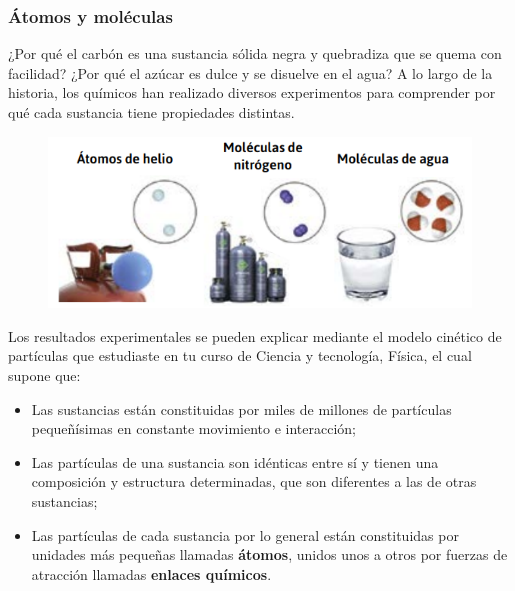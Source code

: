 \documentclass[11pt]{book}
\begin{document}
\subsubsection{Átomos y moléculas}

¿Por qué el carbón es una sustancia sólida negra y quebradiza que se quema con facilidad?
¿Por qué el azúcar es dulce y se disuelve en el agua? A lo largo de la historia, los químicos han realizado
diversos experimentos para comprender por qué cada sustancia tiene propiedades distintas.
\begin{figure}
  \centering
  \includegraphics[width=\linewidth]{atomos01.png}
  \label{fig:atomos01}
\end{figure}
Los resultados experimentales se pueden explicar mediante el modelo
cinético de partículas que estudiaste en tu curso de Ciencia y tecnología, Física, el cual supone que:


\begin{itemize}
  \item[\checkmark] Las sustancias están constituidas por miles de millones de partículas pequeñísimas
        en constante movimiento e interacción;
  \item[\checkmark] Las partículas de una sustancia son idénticas entre sí y tienen una composición y
        estructura determinadas, que son diferentes a las de otras sustancias;
  \item[\checkmark] Las partículas de cada sustancia por lo general están constituidas por unidades más
        pequeñas llamadas \textbf{átomos}, unidos unos a otros por fuerzas de atracción llamadas \textbf{enlaces químicos}.
\end{itemize}
\end{document}

